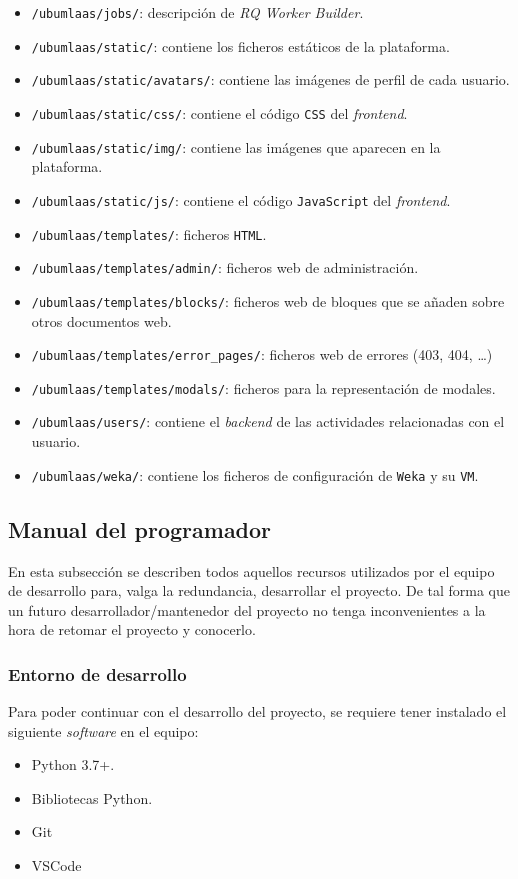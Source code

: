\begin{itemize}
\item \texttt{/ubumlaas/jobs/}: descripción de \textit{RQ Worker Builder}.
\item \texttt{/ubumlaas/static/}: contiene los ficheros estáticos de la plataforma.
\item \texttt{/ubumlaas/static/avatars/}: contiene las imágenes de perfil de cada usuario.
\item \texttt{/ubumlaas/static/css/}: contiene el código \texttt{CSS} del \textit{frontend}.
\item \texttt{/ubumlaas/static/img/}: contiene las imágenes que aparecen en la plataforma.
\item \texttt{/ubumlaas/static/js/}: contiene el código \texttt{JavaScript} del \textit{frontend}.
\item \texttt{/ubumlaas/templates/}: ficheros \texttt{HTML}.
\item \texttt{/ubumlaas/templates/admin/}: ficheros web de administración.
\item \texttt{/ubumlaas/templates/blocks/}: ficheros web de bloques que se añaden sobre otros documentos web.
\item \texttt{/ubumlaas/templates/error\_pages/}: ficheros web de errores (403, 404, \dots)
\item \texttt{/ubumlaas/templates/modals/}: ficheros para la representación de modales.
\item \texttt{/ubumlaas/users/}: contiene el \textit{backend} de las actividades relacionadas con el usuario.
\item \texttt{/ubumlaas/weka/}: contiene los ficheros de configuración de \texttt{Weka} y su \texttt{VM}.

\end{itemize}

\subsection{Manual del programador}
En esta subsección se describen todos aquellos recursos utilizados por el equipo de desarrollo para, valga la redundancia, desarrollar el proyecto. De tal forma que un futuro desarrollador/mantenedor del proyecto no tenga inconvenientes a la hora de retomar el proyecto y conocerlo.

\subsubsection{Entorno de desarrollo}
Para poder continuar con el desarrollo del proyecto, se requiere tener instalado el siguiente \textit{software} en el equipo:
\begin{itemize}
\tightlist
\item Python 3.7+.
\item Bibliotecas Python.
\item Git
\item VSCode
\end{itemize}

